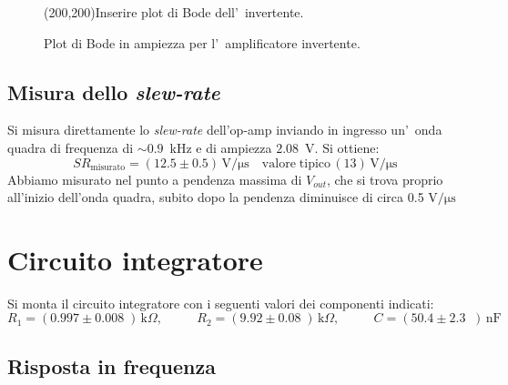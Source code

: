 \documentclass[10pt,a4paper]{article}
\newcommand{\exn}{\phantom{xxx}}
\begin{document}
	
	
	\begin{figure}[h]
		\begin{center}
			\framebox(200,200){Inserire plot di Bode dell'~invertente.}
			\caption{\small Plot di Bode in ampiezza per l'~amplificatore invertente.}
			\label{fig:bodeinv}
		\end{center}
	\end{figure}
	\subsection{Misura dello \emph{slew-rate}}
	Si misura direttamente lo \emph{slew-rate} dell'op-amp inviando in ingresso un'~onda quadra 
	di frequenza di $\sim 0.9$~kHz e di ampiezza $2.08$~V. Si ottiene:
	\[
	SR_\mathrm{misurato} = (12.5 \pm 0.5 )\,\mathrm{V/\mu s} \quad \mathrm{valore \; tipico}\, (13 )\,\mathrm{V/\mu s}\
	\]
Abbiamo misurato nel  punto a pendenza massima di $V_{out}$, che si trova proprio all'inizio dell'onda quadra, subito dopo la pendenza diminuisce di circa 0.5 $ \mathrm{V/\mu s}$
	\section{Circuito integratore}
	Si monta il circuito integratore con i seguenti valori  dei componenti indicati: 
	\[
	R_1 = (0.997 \pm 0.008 \;) \,\mathrm{k}\Omega, \:\:\;\:\exn 
	R_2 = (9.92 \pm 0.08 \;) \,\mathrm{k}\Omega, \:\:\;\:\exn 
	C = (50.4 \pm 2.3 \;\;)\,\mathrm{nF}
	\]
	
	\subsection{Risposta in frequenza}
	
\end{document}
